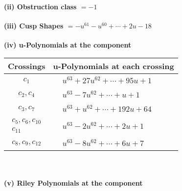 \documentclass[1p]{elsarticle_modified}
\theoremstyle{definition}
\begin{document}
\flushleft \textbf{(ii) Obstruction class $= -1$}\\~\\
\flushleft \textbf{(iii) Cusp Shapes $= - u^{61}- u^{60}+\cdots+2 u-18$}\\~\\
\newpage\renewcommand{\arraystretch}{1}
\flushleft \textbf{(iv) u-Polynomials at the component}\newline \\
\begin{tabular}{m{50pt}|m{274pt}}
Crossings & \hspace{64pt}u-Polynomials at each crossing \\
\hline $$\begin{aligned}c_{1}\end{aligned}$$&$\begin{aligned}
&u^{63}+27 u^{62}+\cdots+95 u+1
\end{aligned}$\\
\hline $$\begin{aligned}c_{2},c_{4}\end{aligned}$$&$\begin{aligned}
&u^{63}-7 u^{62}+\cdots+u+1
\end{aligned}$\\
\hline $$\begin{aligned}c_{3},c_{7}\end{aligned}$$&$\begin{aligned}
&u^{63}+u^{62}+\cdots+192 u+64
\end{aligned}$\\
\hline $$\begin{aligned}c_{5},c_{6},c_{10}\\c_{11}\end{aligned}$$&$\begin{aligned}
&u^{63}-2 u^{62}+\cdots+2 u+1
\end{aligned}$\\
\hline $$\begin{aligned}c_{8},c_{9},c_{12}\end{aligned}$$&$\begin{aligned}
&u^{63}-8 u^{62}+\cdots+6 u+7
\end{aligned}$\\
\hline
\end{tabular}\\~\\
\newpage\renewcommand{\arraystretch}{1}
\flushleft \textbf{(v) Riley Polynomials at the component}\newline \\
\end{document}
